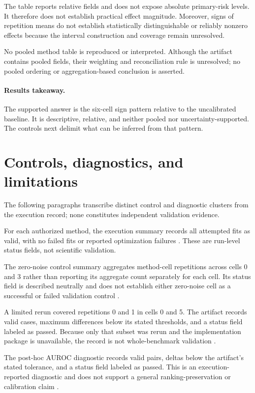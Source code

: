 \documentclass{article}
\begin{document}
The table reports relative fields and does not expose absolute primary-risk levels. It therefore does not establish practical effect magnitude. Moreover, signs of repetition means do not establish statistically distinguishable or reliably nonzero effects because the interval construction and coverage remain unresolved.

No pooled method table is reproduced or interpreted. Although the artifact contains pooled fields, their weighting and reconciliation rule is unresolved; no pooled ordering or aggregation-based conclusion is asserted.

\paragraph{Results takeaway.} The supported answer is the six-cell sign pattern relative to the uncalibrated baseline. It is descriptive, relative, and neither pooled nor uncertainty-supported. The controls next delimit what can be inferred from that pattern.

\section{Controls, diagnostics, and limitations}
The following paragraphs transcribe distinct control and diagnostic clusters from the execution record; none constitutes independent validation evidence.

For each authorized method, the execution summary records all attempted fits as valid, with no failed fits or reported optimization failures \cite{exec}. These are run-level status fields, not scientific validation.

The zero-noise control summary aggregates method-cell repetitions across cells 0 and 3 rather than reporting its aggregate count separately for each cell. Its status field is described neutrally and does not establish either zero-noise cell as a successful or failed validation control \cite{exec}.

A limited rerun covered repetitions 0 and 1 in cells 0 and 5. The artifact records valid cases, maximum differences below its stated thresholds, and a status field labeled as passed. Because only that subset was rerun and the implementation package is unavailable, the record is not whole-benchmark validation \cite{exec}.

The post-hoc AUROC diagnostic records valid pairs, deltas below the artifact's stated tolerance, and a status field labeled as passed. This is an execution-reported diagnostic and does not support a general ranking-preservation or calibration claim \cite{exec}.
\end{document}
